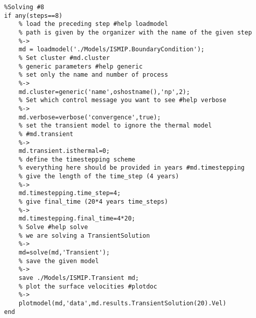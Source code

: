 \begin{verbatim}
%Solving #8
if any(steps==8)
	% load the preceding step #help loadmodel
	% path is given by the organizer with the name of the given step
	%->
	md = loadmodel('./Models/ISMIP.BoundaryCondition');
	% Set cluster #md.cluster
	% generic parameters #help generic
	% set only the name and number of process
	%->
	md.cluster=generic('name',oshostname(),'np',2);
	% Set which control message you want to see #help verbose
	%->
	md.verbose=verbose('convergence',true);
	% set the transient model to ignore the thermal model
	% #md.transient
	%->
	md.transient.isthermal=0;
	% define the timestepping scheme
	% everything here should be provided in years #md.timestepping
	% give the length of the time_step (4 years)
	%->
	md.timestepping.time_step=4;
	% give final_time (20*4 years time_steps)
	%->
	md.timestepping.final_time=4*20;
	% Solve #help solve
	% we are solving a TransientSolution
	%->
	md=solve(md,'Transient');
	% save the given model
	%->
	save ./Models/ISMIP.Transient md;
	% plot the surface velocities #plotdoc
	%->
	plotmodel(md,'data',md.results.TransientSolution(20).Vel)
end\end{verbatim}
